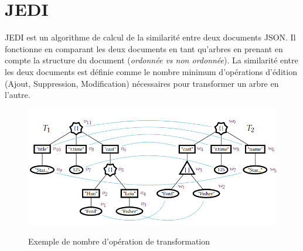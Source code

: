     \section{JEDI}
        JEDI \cite{JEDI} est un algorithme de calcul de la similarité entre deux documents JSON. Il fonctionne en comparant les deux documents en tant qu'arbres en prenant en compte la structure du document (\emph{ordonnée vs non ordonnée}). La similarité entre les deux documents 
        est définie comme le nombre minimum d'opérations d'édition (Ajout, Suppression, Modification) nécessaires pour transformer un arbre en l'autre.
        \begin{figure}[H]
            \centering
            \includegraphics[scale=0.6]{Photos/Tree.png}
            \caption{Exemple de nombre d'opération de transformation}
            \label{fig:tree}
            \cite{JEDI}

        \end{figure}
